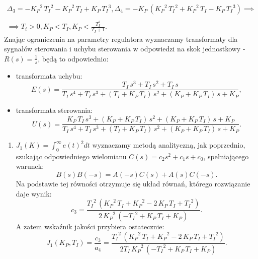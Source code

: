 \documentclass{article}
\begin{document}
\begin{enumerate}[(a)]
$$\begin{array}{c}
                \Delta_{3} = -{K_{P}}^2\,{T_{I}}^2-{K_{P}}^2\,T_{I}+K_{P}\,{T_{I}}^3,
                \Delta_{4} = -K_{P}\,\left({K_{P}}^2\,{T_{I}}^2+{K_{P}}^2\,T_{I}-K_{P}\,{T_{I}}^3\right)
                \implies\\
                \\
                \implies
                T_{i} > 0, K_P < T_I, K_P < \frac{T_I^2}{T_I + 1}.
                \end{array}
        $$
        Znając ograniczenia na parametry regulatora wyznaczamy transformaty dla sygnałów sterowania i uchybu sterowania w odpowiedzi na skok jednostkowy - $R(s) = \frac{1}{s}$, będą to odpowiednio:
        \begin{itemize}
            \item transformata uchybu:
            $$
                E(s)
                =
                \frac{T_{I}\,s^3+T_{I}\,s^2+T_{I}\,s}{T_{I}\,s^4+T_{I}\,s^3+\left(T_{I}+K_{P}\,T_{I}\right)\,s^2+\left(K_{P}+K_{P}\,T_{I}\right)\,s+K_{P}},
            $$
            \item transformata sterowania:
            $$
                U(s)
                =
                \frac{K_{P}\,T_{I}\,s^3+\left(K_{P}+K_{P}\,T_{I}\right)\,s^2+\left(K_{P}+K_{P}\,T_{I}\right)\,s+K_{P}}{T_{I}\,s^4+T_{I}\,s^3+\left(T_{I}+K_{P}\,T_{I}\right)\,s^2+\left(K_{P}+K_{P}\,T_{I}\right)\,s+K_{P}}.
            $$
        \end{itemize}

        \begin{enumerate}[label=(\arabic*.)]
            \item $J_{1}(K) = \int_{0}^{\infty}{e(t)^2dt}$ wyznaczamy metodą analityczną, jak poprzednio, szukając odpowiedniego wielomianu $C(s) = c_{2}s^2 + c_{1}s + c_{0}$, spełniającego warunek:
            $$
                B(s)B(-s) = A(-s)C(s) + A(s)C(-s).
            $$
            Na podstawie tej równości otrzymuje się układ równań, którego rozwiązanie daje wynik:
            $$
                c_{3} = \frac{{T_{I}}^2\,\left({K_{P}}^2\,T_{I}+{K_{P}}^2-2\,K_{P}\,T_{I}+{T_{I}}^2\right)}{2\,{K_{P}}^2\,\left(-{T_{I}}^2+K_{P}\,T_{I}+K_{P}\right)}.
            $$
            A zatem wskaźnik jakości przybiera ostatecznie:
            $$
                J_{1}(K_P, T_I) = \frac{c_3}{a_{4}} = \frac{{T_{I}}^2\,\left({K_{P}}^2\,T_{I}+{K_{P}}^2-2\,K_{P}\,T_{I}+{T_{I}}^2\right)}{2T_{I}\,{K_{P}}^2\,\left(-{T_{I}}^2+K_{P}\,T_{I}+K_{P}\right)}.
            $$


\end{enumerate}
\end{enumerate}
\end{document}
